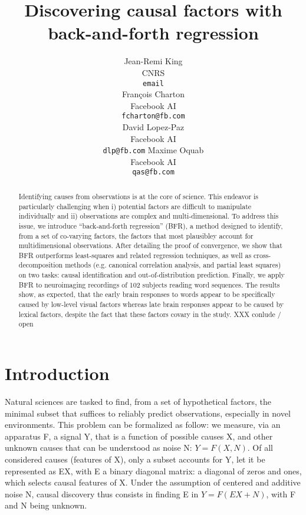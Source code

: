 \documentclass{article}
\title{Discovering causal factors with back-and-forth regression}
\author{%
  Jean-Remi King\\
  CNRS\\
  \texttt{email} \\
  \And
  Fran\c{c}ois Charton\\
  Facebook AI\\
  \texttt{fcharton@fb.com}\\
  \And
  David Lopez-Paz\\
  Facebook AI\\
  \texttt{dlp@fb.com}
  \And
  Maxime Oquab\\
  Facebook AI\\
  \texttt{qas@fb.com}
}
\begin{document}
\maketitle

\begin{abstract}
Identifying causes from observations is at the core of science. This endeavor
is particularly challenging when i) potential factors are difficult to
manipulate individually and ii) observations are complex and multi-dimensional.
To address this issue, we introduce ``back-and-forth regression'' (BFR), a
method designed to identify, from a set of co-varying factors, the factors
that most plausibley account for multidimensional observations. After detailing
the proof of convergence, we show that BFR outperforms least-squares and related
regression techniques, as well as cross-decomposition methods (e.g. canonical
correlation analysis, and partial least squares) on two tasks: causal
identification and out-of-distribution prediction. Finally, we apply BFR to
neuroimaging recordings of 102 subjects reading word sequences. The results
show, as expected, that the early brain responses to words appear to be
specifically caused by low-level visual factors whereas late brain responses
appear to be caused by lexical factors, despite the fact that these factors
covary in the study. XXX conlude / open
\end{abstract}

\section{Introduction}

Natural sciences are tasked to find, from a set of hypothetical factors, the minimal subset that suffices to reliably predict observations, especially in novel environments.
%
This problem can be formalized as follow: we measure, via an apparatus F, a signal Y, that is a function of possible causes X, and other unknown causes that can be understood as noise N: $Y=F(X,N)$. Of all considered causes (features of X), only a subset accounts for Y, let it be represented as EX, with E a binary diagonal matrix: a diagonal of zeros and ones, which selects causal features of X.
%
Under the assumption of centered and additive noise N, causal discovery thus consists in finding E in $Y=F(EX+N)$, with F and N being unknown.
\end{document}
